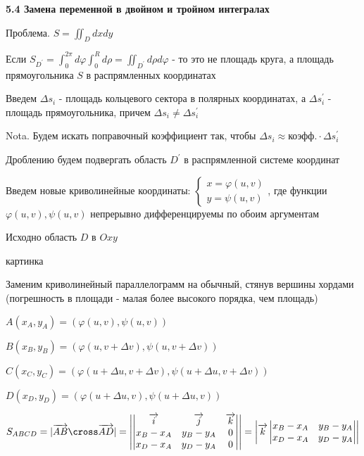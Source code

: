 \documentclass[12pt]{article}
\begin{document}
    \textbf{5.4 Замена переменной в двойном и тройном интегралах}

    Проблема. $S = \iint_D dxdy$

    Если $S_{D^\prime} = \int_0^{2\pi} d\varphi \int_0^R d\rho = \iint_{D^\prime} d\rho d\varphi$ - то это не площадь круга, а площадь прямоугольника $S$ в распрямленных координатах

    Введем $\Delta s_i$ - площадь кольцевого сектора в полярных координатах, а $\Delta s^\prime_i$ - площадь прямоугольника, причем $\Delta s_i \neq \Delta s_i^\prime$

    Nota. Будем искать поправочный коэффициент так, чтобы $\Delta s_i \approx \text{коэфф.} \cdot \Delta s_i^\prime$

    Дроблению будем подвергать область $D^\prime$ в распрямленной системе координат

    Введем новые криволинейные координаты: $\begin{cases}
                                                x = \varphi(u, v) \\ y = \psi(u, v)
    \end{cases}$,
    где функции $\varphi(u, v), \psi(u, v)$ непрерывно дифференцируемы по обоим аргументам

    Исходно область $D$ в $Oxy$

    картинка

    Заменим криволинейный параллелограмм на обычный, стянув вершины хордами (погрешность в площади - малая более высокого порядка, чем площадь)

    $A(x_A, y_A) = (\varphi(u, v), \psi(u, v))$

    $B(x_B, y_B) = (\varphi(u, v+\Delta v), \psi(u, v+\Delta v))$

    $C(x_C, y_C) = (\varphi(u + \Delta u, v+\Delta v), \psi(u + \Delta u, v+\Delta v))$

    $D(x_D, y_D) = (\varphi(u + \Delta u, v), \psi(u + \Delta u, v))$

    $S_{ABCD} = |\overrightarrow{AB} \cross \overrightarrow{AD}| = \left|
    \begin{vmatrix}
        \overrightarrow{i} & \overrightarrow{j} & \overrightarrow{k} \\
        x_B - x_A          & y_B - y_A          & 0                  \\
        x_D - x_A          & y_D - y_A          & 0
    \end{vmatrix}\right| = \left| \overrightarrow{k}
    \begin{vmatrix}
        x_B - x_A & y_B - y_A \\
        x_D - x_A & y_D - y_A
    \end{vmatrix}\right|$
\end{document}
